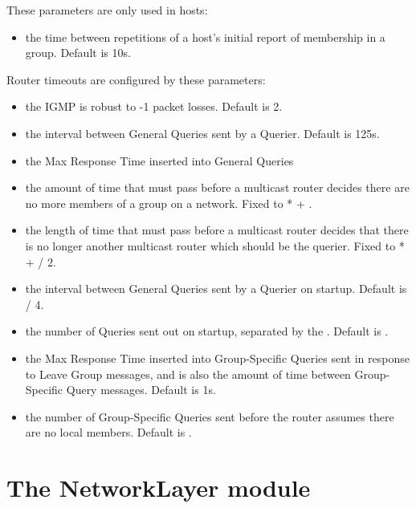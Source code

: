 These parameters are only used in hosts:

\begin{itemize}
  \item {} the time between repetitions of a
   host's initial report of membership in a group. Default is 10s.
\end{itemize}

Router timeouts are configured by these parameters:

\begin{itemize}
  \item {} the IGMP is robust to -1
   packet losses. Default is 2.
  \item {} the interval between General Queries sent by a Querier.
   Default is 125s.
  \item {} the Max Response Time inserted into General Queries
  \item {} the amount of time that must pass before
   a multicast router decides there are no more members of a group on a network.
   Fixed to  *  + .
  \item {} the length of time that must
   pass before a multicast router decides that there is no longer
   another multicast router which should be the querier.
   Fixed to  *  +  / 2.
  \item {} the interval between General Queries
   sent by a Querier on startup. Default is  / 4.
  \item {} the number of Queries sent out on startup,
   separated by the . Default is .
  \item {} the Max Response Time inserted into
   Group-Specific Queries sent in response to Leave Group messages, and
   is also the amount of time between Group-Specific Query messages.
   Default is 1s.
  \item {} the number of Group-Specific Queries
   sent before the router assumes there are no local members.
   Default is .
\end{itemize}

\section{The NetworkLayer module}


